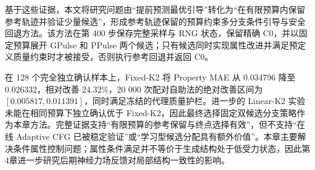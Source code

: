 基于这些证据，本文将研究问题由``提前预测最优引导''转化为``在有限预算内保留参考轨迹并验证少量候选''，形成参考轨迹保留的预算约束多分支条件引导与安全回退方法。该方法在第 400 步保存完整采样与 RNG 状态，保留精确 C0，并以固定预算展开 GPulse 和 PPulse 两个候选；只有候选同时实现属性改进并满足预定义质量约束时才被接受，否则执行参考回退并返回 C0。

在 128 个完全独立确认样本上，Fixed-K2 将 Property MAE 从 0.034796 降至 0.026332，相对改善 24.32\%，20 000 次配对自助法的绝对改善区间为 \([0.005817,0.011391]\)，同时满足冻结的代理质量护栏。进一步的 Linear-K2 实验未能在相同预算下独立确认优于 Fixed-K2，因此最终选择固定双候选分支策略作为本章方法。完整证据支持``有限预算的参考保留与终点选择有效''，但不支持``在线 Adaptive CFG 已被稳定验证''或``学习型候选分配具有额外价值''。本章主要解决条件属性控制问题；属性条件满足并不等价于生成结构处于低受力状态，因此第4章进一步研究后期神经力场反馈对局部结构一致性的影响。
